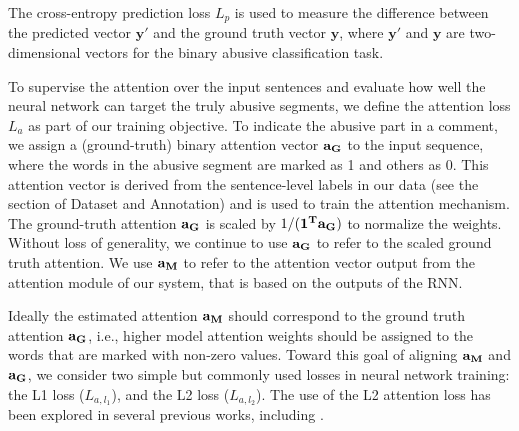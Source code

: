 \documentclass[letterpaper]{article}
\begin{document}
The cross-entropy prediction loss $L_{p}$ is used to measure the difference between the predicted vector $\mathbf{y}'$ and the ground truth vector $\mathbf{y}$, where $\mathbf{y}'$ and $\mathbf{y}$ are two-dimensional vectors for the binary abusive classification task.

To supervise the attention over the input sentences and evaluate how well the neural network can target the truly abusive segments, we define the attention loss $L_{a}$ as part of our training objective. To indicate the abusive part in a comment, we assign a (ground-truth) binary attention vector $\bf{a}_{G}$ to the input sequence, where the words in the abusive segment are marked as 1 and others as 0. This attention vector is derived from the sentence-level labels in our data (see the section of Dataset and Annotation) and is used to train the attention mechanism. The ground-truth attention $\bf{a}_{G}$ is scaled by $1/(\bf{1}^{T}\bf{a}_{G})$ to normalize the weights. Without loss of generality, we continue to use $\bf{a}_{G}$ to refer to the scaled ground truth attention.  We use $\bf{a}_{M}$ to refer to  the attention vector output from the attention module of our system, that is   based on the outputs of the RNN.

Ideally the estimated attention $\bf{a}_{M}$ should correspond to the ground truth attention $\bf{a}_{G}$, i.e., higher model attention weights should be assigned to the words that are marked with non-zero values. Toward this goal of aligning $\bf{a}_{M}$ and  $\bf{a}_{G}$, we consider two simple but commonly used losses in neural network training: the L1 loss ($L_{a,l_1}$), and the L2 loss ($L_{a,l_2}$). The use of the L2 attention loss has been  explored in several previous works, including \cite{liu2016neural,liu2017exploiting}.

\begin{table}[htbp!]
\captionsetup{font=normalsize}
\centering
{}
\caption{Abusive language detection performance. C:  using only comment labels, and C+S:  using comment and sentence labels. }
\label{tab:detection_performance}
\end{table}
\end{document}
